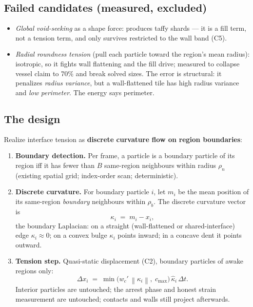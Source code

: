 \documentclass[11pt]{article}
\newcommand{\dt}{\Delta t}
\newcommand{\norm}[1]{\left\lVert #1 \right\rVert}
\begin{document}
\subsection{Failed candidates (measured, excluded)}

\begin{itemize}[leftmargin=1.4em]
\item \emph{Global void-seeking} as a shape force: produces taffy shards ---
it is a fill term, not a tension term, and only survives restricted to the
wall band (C5).
\item \emph{Radial roundness tension} (pull each particle toward the region's
mean radius): isotropic, so it fights wall flattening and the fill drive;
measured to collapse vessel claim to 70\% and break solved sizes. The error is
structural: it penalizes \emph{radius variance}, but a wall-flattened tile has
high radius variance and \emph{low perimeter}. The energy says perimeter.
\end{itemize}

\subsection{The design}

Realize interface tension as \textbf{discrete curvature flow on region
boundaries}:

\begin{enumerate}[leftmargin=1.6em]
\item \textbf{Boundary detection.} Per frame, a particle is a boundary
particle of its region iff it has fewer than $B$ same-region neighbours
within radius $\rho_n$ (existing spatial grid; index-order scan;
deterministic).
\item \textbf{Discrete curvature.} For boundary particle $i$, let $m_i$ be
the mean position of its same-region \emph{boundary} neighbours within
$\rho_b$. The discrete curvature vector is
\[
\kappa_i \;=\; m_i - x_i ,
\]
the boundary Laplacian: on a straight (wall-flattened or shared-interface)
edge $\kappa_i \approx 0$; on a convex bulge $\kappa_i$ points inward; in a
concave dent it points outward.
\item \textbf{Tension step.} Quasi-static displacement (C2), boundary
particles of awake regions only:
\[
\Delta x_i \;=\; \min\!\big(w_c'\,\norm{\kappa_i},\; c_{\max}\big)\,
\hat\kappa_i\,\dt .
\]
Interior particles are untouched; the arrest phase and honest strain
measurement are untouched; contacts and walls still project afterwards.
\end{enumerate}
\end{document}
